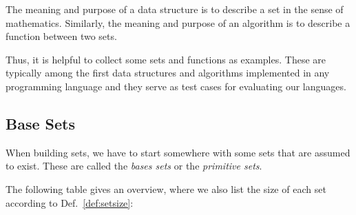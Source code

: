 The meaning and purpose of a data structure is to describe a set in the sense of mathematics.
Similarly, the meaning and purpose of an algorithm is to describe a function between two sets.

Thus, it is helpful to collect some sets and functions as examples.
These are typically among the first data structures and algorithms implemented in any programming language and they serve as test cases for evaluating our languages.

\subsection{Base Sets}\label{sec:math:sets:prim}

When building sets, we have to start somewhere with some sets that are assumed to exist.
These are called the \emph{bases sets} or the \emph{primitive sets}.

The following table gives an overview, where we also list the size of each set according to Def.~\ref{def:setsize}:

